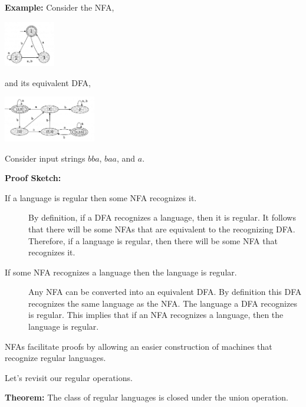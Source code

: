 \documentclass[a4paper,blends,pdf,colorBG,slideColor]{prosper}
\begin{document}
\es

{\bf Example:} Consider the NFA,
\begin{center}
\includegraphics[height=20mm]{images/nfa3.eps}
\end{center}
and its equivalent DFA,
\begin{center}
\includegraphics[height=20mm]{images/nfa3-dfa.eps}
\end{center}

Consider input strings $bba$, $baa$, and $a$.
\es

\vspace{.5in}
\begin{center}
\end{center}

{\bf Proof Sketch:}
\begin{description}
\item[If a language is regular then some NFA recognizes it.]
	By definition, if a DFA recognizes a language, then it is regular.  It follows that there will
	be some NFAs that are equivalent to the recognizing DFA.  Therefore, if a language
	is regular, then there will be some NFA that recognizes it.
\item[If some NFA recognizes a language then the language is regular.]
	Any NFA can be converted into an equivalent DFA.  By definition this DFA
	recognizes the same language as the NFA.  The language a DFA recognizes
	is regular.  This implies that if an NFA recognizes a language, then the language is
	regular.
\end{description}
\es


NFAs facilitate proofs by allowing an easier construction of machines that recognize
regular languages.

Let's revisit our regular operations.
\es

{\bf Theorem:} The class of regular languages is closed under the union operation.
\end{document}
